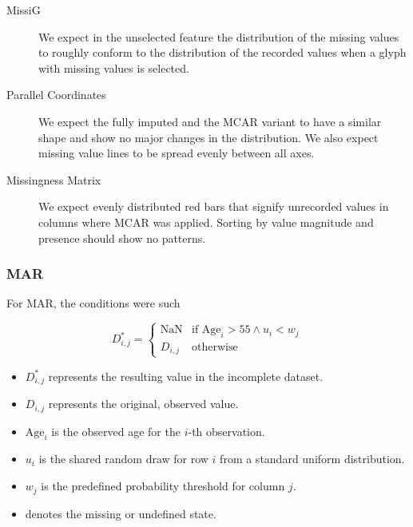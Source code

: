 \documentclass[a4paper, 11pt]{article}
\begin{document}
\begin{description}
        \item [MissiG] We expect in the unselected feature the distribution of
                the missing values to roughly conform to the distribution of
                the recorded values when a glyph with missing values is
                selected. 

        \item [Parallel Coordinates] We expect the fully imputed and the MCAR
                variant to have a similar shape and show no major changes in
                the distribution. We also expect missing value lines to be
                spread evenly between all axes.

        \item [Missingness Matrix] We expect evenly distributed red bars that
                signify unrecorded values in columns where MCAR was applied.
                Sorting by value magnitude and presence should show no
                patterns.
\end{description}


\subsubsection*{MAR}

For MAR, the conditions were such

\begin{equation} 
D_{i,j}^* = 
\begin{cases} 
\text{NaN} & \text{if } \text{Age}_i > 55 \land u_i < w_j \\ 
D_{i,j} & \text{otherwise} 
\end{cases}
\end{equation} 

\begin{itemize}
    \item $D_{i,j}^*$ represents the resulting value in the incomplete dataset.
    \item $D_{i,j}$ represents the original, observed value.
    \item $\text{Age}_i$ is the observed age for the $i$-th observation.
    \item $u_i$ is the shared random draw for row $i$ from a standard uniform distribution.
    \item $w_j$ is the predefined probability threshold for column $j$.
    \item {} denotes the missing or undefined state.
\end{itemize}
\end{document}
